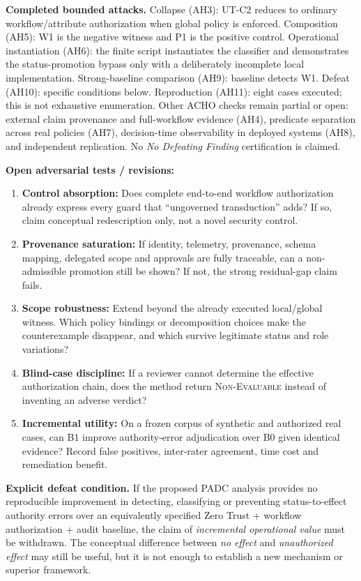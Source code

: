 \documentclass[11pt,a4paper]{article}
\newcommand{\heading}[1]{\vspace{2pt}\textbf{\color{accent}#1}}
\newcommand{\NE}{\textsc{Non-Evaluable}}
\begin{document}
\textbf{Completed bounded attacks.} Collapse (AH3): UT-C2 reduces to ordinary workflow/attribute authorization when global policy is enforced. Composition (AH5): W1 is the negative witness and P1 is the positive control. Operational instantiation (AH6): the finite script instantiates the classifier and demonstrates the status-promotion bypass only with a deliberately incomplete local implementation. Strong-baseline comparison (AH9): baseline detects W1. Defeat (AH10): specific conditions below. Reproduction (AH11): eight cases executed; this is not exhaustive enumeration. Other ACHO checks remain partial or open: external claim provenance and full-workflow evidence (AH4), predicate separation across real policies (AH7), decision-time observability in deployed systems (AH8), and independent replication. No \emph{No Defeating Finding} certification is claimed.

\textbf{Open adversarial tests / revisions:}
\begin{enumerate}
\item \textbf{Control absorption:} Does complete end-to-end workflow authorization already express every guard that ``ungoverned transduction'' adds? If so, claim conceptual redescription only, not a novel security control.
\item \textbf{Provenance saturation:} If identity, telemetry, provenance, schema mapping, delegated scope and approvals are fully traceable, can a non-admissible promotion still be shown? If not, the strong residual-gap claim fails.
\item \textbf{Scope robustness:} Extend beyond the already executed local/global witness. Which policy bindings or decomposition choices make the counterexample disappear, and which survive legitimate status and role variations?
\item \textbf{Blind-case discipline:} If a reviewer cannot determine the effective authorization chain, does the method return \NE{} instead of inventing an adverse verdict?
\item \textbf{Incremental utility:} On a frozen corpus of synthetic and authorized real cases, can B1 improve authority-error adjudication over B0 given identical evidence? Record false positives, inter-rater agreement, time cost and remediation benefit.
\end{enumerate}

\heading{Explicit defeat condition.} If the proposed PADC analysis provides no reproducible improvement in detecting, classifying or preventing status-to-effect authority errors over an equivalently specified Zero Trust + workflow authorization + audit baseline, the claim of \emph{incremental operational value} must be withdrawn. The conceptual difference between \emph{no effect} and \emph{unauthorized effect} may still be useful, but it is not enough to establish a new mechanism or superior framework.
\end{document}

